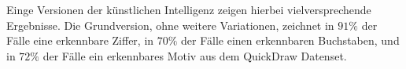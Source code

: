Einge Versionen der künstlichen Intelligenz zeigen hierbei vielversprechende
Ergebnisse. Die Grundversion, ohne weitere Variationen, zeichnet in $91\%$ der
Fälle eine erkennbare Ziffer, in $70\%$ der Fälle einen erkennbaren Buchstaben,
und in $72\%$ der Fälle ein erkennbares Motiv aus dem QuickDraw Datenset. 


